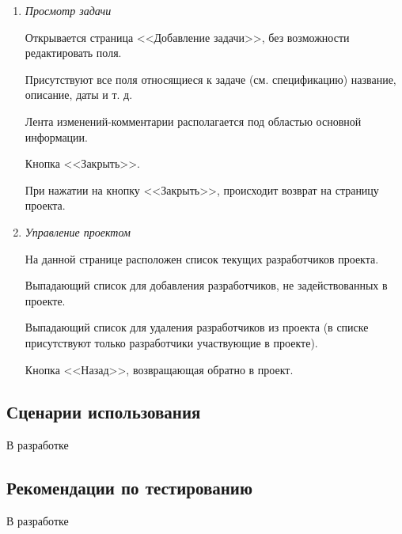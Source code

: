 \documentclass[14pt,a4paper]{extarticle}
\begin{document}
\begin{enumerate}
		\item {\it Просмотр задачи}
		\par Открывается страница <<Добавление задачи>>, без возможности редактировать поля.
		\par Присутствуют все поля относящиеся к задаче (см. спецификацию) название, описание, даты и т. д.
		\par Лента изменений-комментарии располагается под областью основной информации.
		\par Кнопка <<Закрыть>>.
		\par При нажатии на кнопку <<Закрыть>>, происходит возврат на страницу проекта.
		
		\item {\it Управление проектом}
		\par На данной странице расположен список текущих разработчиков проекта.
		\par Выпадающий список для добавления разработчиков, не задействованных в проекте.
		\par Выпадающий список для удаления разработчиков из проекта (в списке присутствуют только разработчики участвующие в проекте).
		\par Кнопка <<Назад>>, возвращающая обратно в проект.

	\end{enumerate}
			
	\subsection {Сценарии использования}
	В разработке
		
	\subsection {Рекомендации по тестированию}
	В разработке
	
\end{document}
